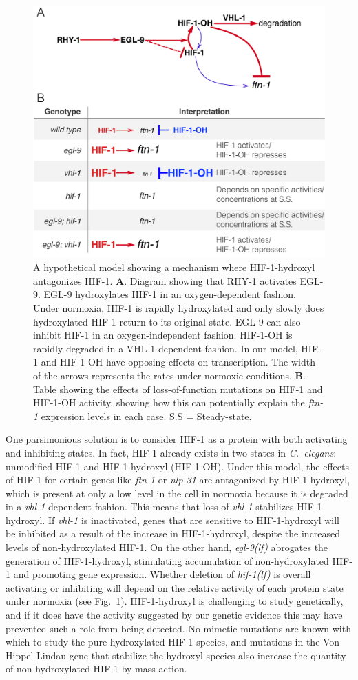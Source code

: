 \documentclass[9pt,twocolumn,twoside]{pnas-new}
\newcommand{\cel}{\emph{C.~elegans}}
\newcommand{\gene}[1]{\mbox{\emph{#1}}}
\newcommand{\nlp}{\gene{nlp-31}}
\newcommand{\ftna}{\gene{ftn-1}}
\newcommand{\egl}{\gene{egl-9(lf)}}
\newcommand{\hif}{\gene{hif-1(lf)}}
\newcommand{\hifp}{HIF-1}
\begin{document}
\begin{figure}[tbhp]
  \centering
  \includegraphics[width=.5\textwidth]{../figs/hif1oh_model.pdf}
  \caption{
    A hypothetical model showing a mechanism where \hifp{}-hydroxyl antagonizes
    \hifp{}. \textbf{A}. Diagram showing that RHY-1 activates EGL-9. EGL-9
    hydroxylates HIF-1 in an oxygen-dependent fashion. Under normoxia, HIF-1 is
    rapidly hydroxylated and only slowly does hydroxylated HIF-1 return to its
    original state. EGL-9 can also inhibit HIF-1 in an oxygen-independent
    fashion. HIF-1-OH is rapidly degraded in a VHL-1-dependent fashion. In
    our model, HIF-1 and HIF-1-OH have opposing effects on transcription.
    The width of the arrows represents the rates under normoxic conditions.
    \textbf{B}. Table showing the effects of loss-of-function mutations on HIF-1
    and HIF-1-OH activity, showing how this can potentially explain the
    \gene{ftn-1} expression levels in each case. S.S = Steady-state.
  }
\label{fig:hif1oh_table}
\end{figure}

One parsimonious solution is to consider \hifp{} as a protein with both
activating and inhibiting states. In fact, \hifp{} already exists in two states
in \cel{}: unmodified \hifp{} and \hifp{}-hydroxyl (\hifp{}-OH). Under this
model, the effects of \hifp{} for certain genes like \ftna{} or \nlp{} are
antagonized by \hifp{}-hydroxyl, which is present at only a low level in the
cell in normoxia because it is degraded in a \gene{vhl-1}-dependent fashion.
This means that loss of \gene{vhl-1} stabilizes \hifp{}-hydroxyl. If \gene{vhl-1}
is inactivated, genes that are
sensitive to \hifp{}-hydroxyl will be inhibited as a result of the increase in
\hifp{}-hydroxyl, despite the increased levels of
non-hydroxylated \hifp{}. On the other hand, \egl{}
abrogates the generation of \hifp{}-hydroxyl, stimulating accumulation of
non-hydroxylated \hifp{} and promoting gene expression. Whether deletion of \hif{}
is overall activating or inhibiting will depend on the relative activity of each
protein state under normoxia (see Fig.~\ref{fig:hif1oh_table}). \hifp{}-hydroxyl
is challenging to study genetically, and if it does have the activity suggested
by our genetic evidence this may have prevented such a role from being detected.
No mimetic mutations are known with which to study the pure
hydroxylated \hifp{} species, and mutations in the Von Hippel-Lindau gene that
stabilize the hydroxyl species also increase the quantity of non-hydroxylated
\hifp{} by mass action.
\end{document}
